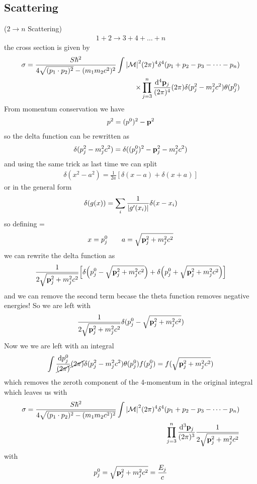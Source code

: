\documentclass[../main.tex]{subfiles}
\begin{document}
\subsection*{Scattering} 
($2 \to n$ Scattering)
\begin{align*}
    1 + 2 \to 3 + 4 + \dots + n
\end{align*}
the cross section is given by
\begin{align*}
    \sigma = \frac{S\hbar^2}{4\sqrt{(p_1 \cdot p_2)^2} - (m_1 m_2 c^2)^2}
    \int \abs{\mathcal{M}}^2 (2\pi)^4 \delta^4(p_1 + p_2 - p_3 - \dots - p_n) \\
    \times \prod_{j=3}^n \frac{\dd^4 \vb p_j}{(2\pi)^4} (2\pi) \delta(p_j^2 - m_j^2 c^2) \theta(p_j^0) 
\end{align*}
From momentum conservation we have
\begin{align*}
    p^2 = (p^0)^2 - \vb p^2
\end{align*}
so the delta function can be rewritten as
\begin{align*}
    \delta(p_j^2 - m_j^2 c^2) = \delta((p_j^0)^2 - \vb p_j^2 - m_j^2 c^2)
\end{align*}
and using the same trick as last time we can split
\begin{align*}
    \delta(x^2 - a^2) = \frac{1}{2a} [\delta(x - a) + \delta(x + a)]
\end{align*}
or in the general form
\begin{align*}
    \delta(g(x)) = \sum_i \frac{1}{\abs{g'(x_i)}} \delta(x - x_i)
\end{align*}
so defining =
\begin{align*}
    x = p_j^0 \qquad a = \sqrt{\vb p_j^2 + m_j^2 c^2}
\end{align*}
we can rewrite the delta function as
\begin{align*}
    \frac{1}{2\sqrt{\vb p_j^2 + m_j^2 c^2}} \qt[\delta \qt(p_j^0 - \sqrt{\vb p_j^2 + m_j^2 c^2})
    + \delta \qt(p_j^0 + \sqrt{\vb p_j^2 + m_j^2 c^2})]
\end{align*}
and we can remove the second term becase the theta function removes negative energies! So we are left
with
\begin{align*}
    \frac{1}{2\sqrt{\vb p_j^2 + m_j^2 c^2}} \delta(p_j^0 - \sqrt{\vb p_j^2 + m_j^2 c^2})
\end{align*}
Now we we are left with an integral
\begin{align*}
    \int \frac{\dd{p_j^0}}{\cancel{(2\pi)}} \cancel{(2\pi)} \delta(p_j^2 - m_j^2 c^2) \theta(p_j^0)
    f(p_j^0) = f(\sqrt{\vb p_j^2 + m_j^2 c^2})
\end{align*}
which removes the zeroth component of the 4-momentum in the original integral which leaves us with
\begin{align*}
    \sigma = \frac{S \hbar^2}{4\sqrt{(p_1 \cdot p_2)^2 - (m_1 m_2 c^2)^2}} \int \abs{\mathcal{M}}^2
    (2\pi)^4 \delta^4(p_1 + p_2 - p_3 - \dots - p_n) \\
    \prod_{j=3}^n \frac{\dd^3 \vb p_j}{(2\pi)^3} \frac{1}{2\sqrt{\vb p_j^2 + m_j^2 c^2}}
\end{align*}
with
\begin{align*}
    p_j^0 = \sqrt{\vb p_j^2 + m_j^2 c^2} = \frac{E_j}{c}
\end{align*}
\end{document}
